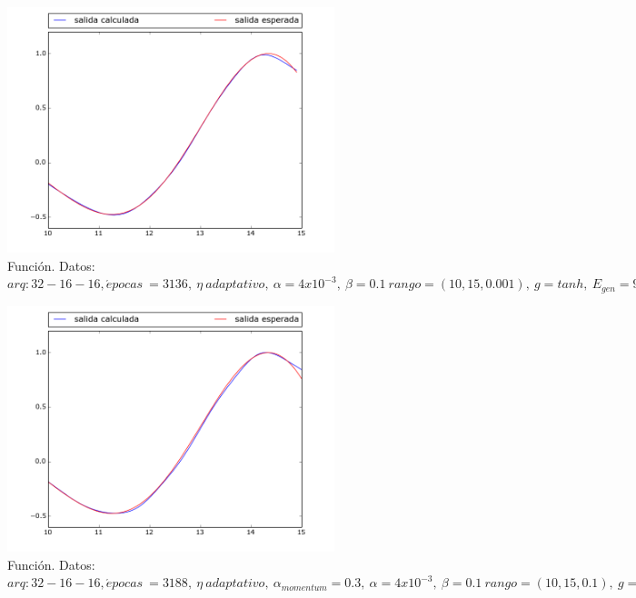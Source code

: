 \documentclass[12pt,a4paper]{article}
\begin{document}
\begin{figure}[H]
\centering
\includegraphics[width=0.85\textwidth]{img/_32__16__16_adaptative-test-1430833617_1787126-FUNCTION-0_001.png}
\caption{\label{fig:test10-15-tanh-fn-32-adaptative-0.001} Función. Datos:  $arq: 32-16-16, \acute{e} pocas \ = 3136, \ \eta \ adaptativo, \ \alpha = 4x10^{-3},\ \beta =0.1  \ rango=(10, 15, 0.001),\ g=tanh, \ E_{gen} =9,35 \times 10^{-5}$}
\end{figure}

\begin{figure}[H]
\centering
\includegraphics[width=0.85\textwidth]{img/_32__16__16_-momentumadaptative-test-1430834380_6222725-FUNCTION-0_001.png}
\caption{\label{fig:test10-15-tanh-fn-32-adaptative-momentum-0.001} Función. Datos:  $arq: 32-16-16, \acute{e} pocas \ = 3188, \ \eta \ adaptativo, \ \alpha_{momentum} = 0.3, \ \alpha = 4x10^{-3},\ \beta =0.1  \ rango=(10, 15, 0.1),\ g=tanh, \ E_{gen} =8,81 \times 10^{-5}$}
\end{figure}
\end{document}
